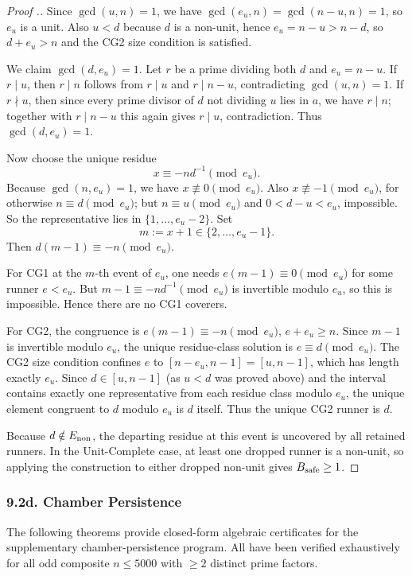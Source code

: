 \documentclass[11pt,a4paper]{article}
\theoremstyle{plain}
\theoremstyle{definition}
\theoremstyle{remark}
\begin{document}
\begin{proof}[Proof .]
Since $\gcd(u,n)=1$, we have $\gcd(e_u,n)=\gcd(n-u,n)=1$, so $e_u$ is a unit. Also $u<d$ because $d$ is a non-unit, hence $e_u=n-u>n-d$, so $d+e_u>n$ and the CG2 size condition is satisfied.

We claim $\gcd(d,e_u)=1$. Let $r$ be a prime dividing both $d$ and $e_u=n-u$. If $r \mid u$, then $r \mid n$ follows from $r \mid u$ and $r \mid n-u$, contradicting $\gcd(u,n)=1$. If $r \nmid u$, then since every prime divisor of $d$ not dividing $u$ lies in $a$, we have $r \mid n$; together with $r \mid n-u$ this again gives $r \mid u$, contradiction. Thus $\gcd(d,e_u)=1$.

Now choose the unique residue
\[x \equiv -n d^{-1} \pmod{e_u}.\]
Because $\gcd(n,e_u)=1$, we have $x \not\equiv 0 \pmod{e_u}$. Also $x \not\equiv -1 \pmod{e_u}$, for otherwise $n \equiv d \pmod{e_u}$; but $n \equiv u \pmod{e_u}$ and $0<d-u<e_u$, impossible. So the representative lies in $\{1,\ldots,e_u-2\}$. Set
\[m := x+1 \in \{2,\ldots,e_u-1\}.\]
Then $d(m-1) \equiv -n \pmod{e_u}$.

For CG1 at the $m$-th event of $e_u$, one needs $e(m-1)\equiv 0 \pmod{e_u}$ for some runner $e<e_u$. But $m-1 \equiv -n d^{-1} \pmod{e_u}$ is invertible modulo $e_u$, so this is impossible. Hence there are no CG1 coverers.

For CG2, the congruence is $e(m-1) \equiv -n \pmod{e_u}$, $e+e_u \geq n$. Since $m-1$ is invertible modulo $e_u$, the unique residue-class solution is $e \equiv d \pmod{e_u}$. The CG2 size condition confines $e$ to $[n-e_u,n-1]=[u,n-1]$, which has length exactly $e_u$. Since $d \in [u,n-1]$ (as $u < d$ was proved above) and the interval contains exactly one representative from each residue class modulo $e_u$, the unique element congruent to $d$ modulo $e_u$ is $d$ itself. Thus the unique CG2 runner is $d$.

Because $d \notin E_{\rm non}$, the departing residue at this event is uncovered by all retained runners. In the Unit-Complete case, at least one dropped runner is a non-unit, so applying the construction to either dropped non-unit gives $B_{\rm safe} \geq 1$.
\end{proof}


\subsubsection{9.2d. Chamber Persistence}


The following theorems provide closed-form algebraic certificates for the supplementary chamber-persistence program. All have been verified exhaustively for all odd composite $n \leq 5000$ with $\geq 2$ distinct prime factors.
\end{document}
